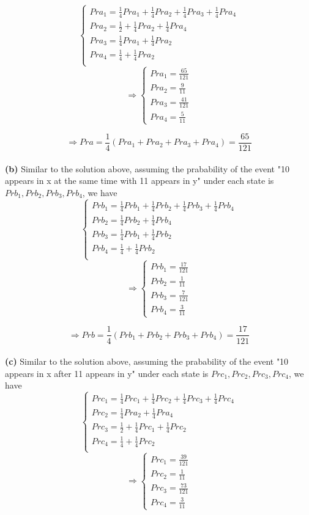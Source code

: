 \documentclass{article} %
\begin{document}
	$$
	\begin{cases}
	Pra_1=\frac{1}{4}Pra_1+\frac{1}{4}Pra_2+\frac{1}{4}Pra_3+\frac{1}{4}Pra_4\\
	Pra_2=\frac{1}{2}+\frac{1}{4}Pra_2+\frac{1}{4}Pra_4\\
	Pra_3=\frac{1}{4}Pra_1+\frac{1}{4}Pra_2\\
	Pra_4=\frac{1}{4}+\frac{1}{4}Pra_2\\
	\end{cases}
	$$
    $$
	\Rightarrow 
	\begin{cases}
	Pra_1=\frac{65}{121}\\
	Pra_2=\frac{9}{11}\\
	Pra_3=\frac{41}{121}\\
	Pra_4=\frac{5}{11}
	\end{cases}
	$$
	
	$$\Rightarrow Pra=\frac{1}{4}(Pra_1+Pra_2+Pra_3+Pra_4) = \frac{65}{121} $$\\
	
	\textbf{(b)}   Similar to the solution above, assuming the prabability of the event "10 appears in x at the same time with 11 appears in y" under each state is $Prb_1,Prb_2,Prb_3,Prb_4$, we have
	$$
	\begin{cases}
	Prb_1=\frac{1}{4}Prb_1+\frac{1}{4}Prb_2+\frac{1}{4}Prb_3+\frac{1}{4}Prb_4\\
	Prb_2=\frac{1}{4}Prb_2+\frac{1}{4}Prb_4\\
	Prb_3=\frac{1}{4}Prb_1+\frac{1}{4}Prb_2\\
	Prb_4=\frac{1}{4}+\frac{1}{4}Prb_2\\
	\end{cases}
	$$
	$$
	\Rightarrow 
	\begin{cases}
	Prb_1=\frac{17}{121}\\
	Prb_2=\frac{1}{11}\\
	Prb_3=\frac{7}{121}\\
	Prb_4=\frac{3}{11}
	\end{cases}
	$$
	
	$$\Rightarrow Prb=\frac{1}{4}(Prb_1+Prb_2+Prb_3+Prb_4) = \frac{17}{121} $$\\
	
	\textbf{(c)}   Similar to the solution above, assuming the prabability of the event "10 appears in x after 11 appears in y" under each state is $Prc_1,Prc_2,Prc_3,Prc_4$, we have
	$$
	\begin{cases}
	Prc_1=\frac{1}{4}Prc_1+\frac{1}{4}Prc_2+\frac{1}{4}Prc_3+\frac{1}{4}Prc_4\\
	Prc_2=\frac{1}{4}Pra_2+\frac{1}{4}Pra_4\\
	Prc_3=\frac{1}{2}+\frac{1}{4}Prc_1+\frac{1}{4}Prc_2\\
	Prc_4=\frac{1}{4}+\frac{1}{4}Prc_2\\
	\end{cases}
	$$
	$$	\Rightarrow 
	\begin{cases}
	Prc_1=\frac{39}{121}\\
	Prc_2=\frac{1}{11}\\
	Prc_3=\frac{73}{121}\\
	Prc_4=\frac{3}{11}
	\end{cases}
	$$
\end{document}
